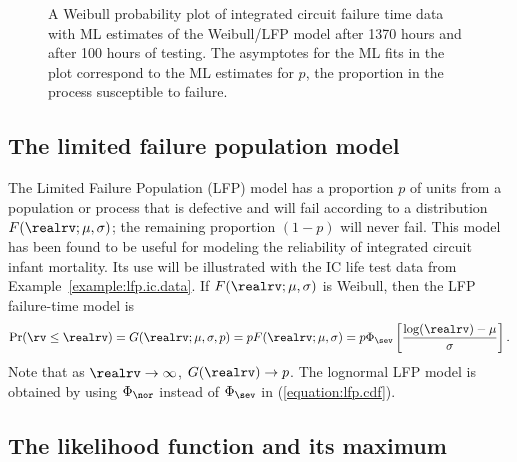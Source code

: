 
\begin{figure}
\caption{A Weibull probability plot of integrated circuit failure time
data with ML estimates of the Weibull/LFP model after 1370 hours and
after 100 hours of testing.  The asymptotes for the ML fits in the
plot correspond to the ML estimates for $p$, the proportion in the
process susceptible to failure.}
\label{figure:lfp.probability.plot.ps}
\end{figure}

\subsection{The limited failure population model}
\label{section:lfp.model}
The Limited Failure Population (LFP) model has a proportion $p$ of
units from a population or process that is defective and will fail
according to a distribution $F(\realrv;\mu,\sigma)$; the remaining
proportion $(1-p)$ will never fail.  This model has been found to be
useful for modeling the reliability of integrated circuit infant
mortality. Its use will be illustrated with the IC life test data
from Example~\ref{example:lfp.ic.data}. If $F(\realrv;\mu,\sigma)$
is Weibull, then the LFP failure-time model is
\begin{equation}
\label{equation:lfp.cdf}
\Pr(\rv \leq \realrv) = G(\realrv;\mu,\sigma,p) = pF(\realrv;\mu,\sigma)
= p \Phi_{\sev}\left[\frac{ \log(\realrv) - \mu}{\sigma}
\right].
\end{equation}
Note that as $\realrv \rightarrow \infty$, $G(\realrv) \rightarrow p$. The 
lognormal LFP model is obtained by using  $\Phi_{\nor}$
instead of $\Phi_{\sev}$ in (\ref{equation:lfp.cdf}).


\subsection{The likelihood function and its maximum}

